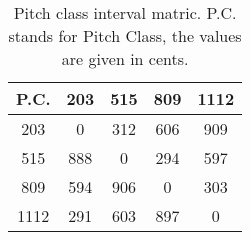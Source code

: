 \begin{table}
\begin{tabular}{c||  c  c  c  c  }	
P.C. & 203 & 515 & 809 & 1112 \\
\hline
\hline
203 & 0 & 312 & 606 & 909\\
515 & 888 & 0 & 294 & 597\\
809 & 594 & 906 & 0 & 303\\
1112 & 291 & 603 & 897 & 0     	
\end{tabular}
\label{tbl:pitch_class_interval_matrix}
\caption{Pitch class interval matric. P.C. stands for Pitch Class, the values are given in cents.}
\end{table}
